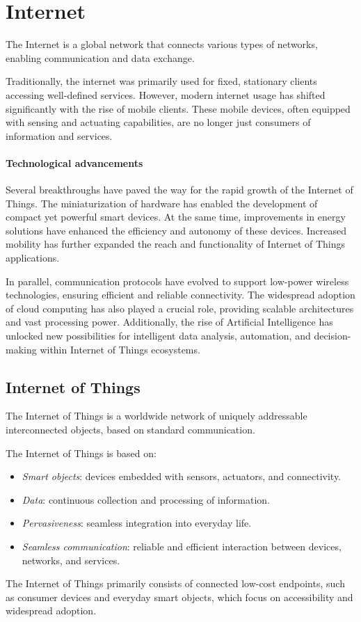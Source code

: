 \section{Internet}

\begin{definition}
    The Internet is a global network that connects various types of networks, enabling communication and data exchange.
\end{definition}
Traditionally, the internet was primarily used for fixed, stationary clients accessing well-defined services. 
However, modern internet usage has shifted significantly with the rise of mobile clients. 
These mobile devices, often equipped with sensing and actuating capabilities, are no longer just consumers of information and services.

\paragraph*{Technological advancements}
Several breakthroughs have paved the way for the rapid growth of the Internet of Things. 
The miniaturization of hardware has enabled the development of compact yet powerful smart devices. 
At the same time, improvements in energy solutions have enhanced the efficiency and autonomy of these devices. 
Increased mobility has further expanded the reach and functionality of Internet of Things applications.

In parallel, communication protocols have evolved to support low-power wireless technologies, ensuring efficient and reliable connectivity. 
The widespread adoption of cloud computing has also played a crucial role, providing scalable architectures and vast processing power. 
Additionally, the rise of Artificial Intelligence has unlocked new possibilities for intelligent data analysis, automation, and decision-making within Internet of Things ecosystems.

\subsection{Internet of Things}
\begin{definition}
    The Internet of Things is a worldwide network of uniquely addressable interconnected objects, based on standard communication.
\end{definition}
\noindent The Internet of Things is based on: 
\begin{itemize}
    \item \textit{Smart objects}: devices embedded with sensors, actuators, and connectivity.
    \item \textit{Data}: continuous collection and processing of information.
    \item \textit{Pervasiveness}: seamless integration into everyday life.
    \item \textit{Seamless communication}: reliable and efficient interaction between devices, networks, and services.
\end{itemize}
\noindent The Internet of Things primarily consists of connected low-cost endpoints, such as consumer devices and everyday smart objects, which focus on accessibility and widespread adoption.

